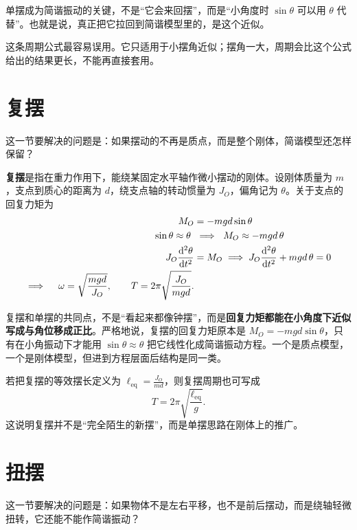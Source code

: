 \documentclass[lang=cn,11pt]{elegantbook}
\newcommand{\bridge}[1]{\begin{note}#1\end{note}}
\begin{document}
\bridge{单摆成为简谐振动的关键，不是“它会来回摆”，而是“小角度时 \(\sin\theta\) 可以用 \(\theta\) 代替”。也就是说，真正把它拉回到简谐模型里的，是这个近似。}

\begin{note}
这条周期公式最容易误用。它只适用于小摆角近似；摆角一大，周期会比这个公式给出的结果更长，不能再直接套用。
\end{note}

\section{复摆}

这一节要解决的问题是：如果摆动的不再是质点，而是整个刚体，简谐模型还怎样保留？

\textbf{复摆}是指在重力作用下，能绕某固定水平轴作微小摆动的刚体。设刚体质量为 \(m\)，支点到质心的距离为 \(d\)，绕支点轴的转动惯量为 \(J_O\)，偏角记为 \(\theta\)。关于支点的回复力矩为
\[
\begin{aligned}
M_O&=-mgd\sin\theta \\
\sin\theta\approx \theta\ &\implies\ M_O\approx -mgd\,\theta \\
J_O\dv[2]{\theta}{t}&=M_O
\implies J_O\dv[2]{\theta}{t}+mgd\,\theta=0 \\
\implies\quad
\omega=\sqrt{\frac{mgd}{J_O}},\qquad
T=2\pi\sqrt{\frac{J_O}{mgd}}.
\end{aligned}
\]

\begin{note}
复摆和单摆的共同点，不是“看起来都像钟摆”，而是\textbf{回复力矩都能在小角度下近似写成与角位移成正比}。严格地说，复摆的回复力矩原本是 \(M_O=-mgd\sin\theta\)，只有在小角振动下才能用 \(\sin\theta\approx\theta\) 把它线性化成简谐振动方程。一个是质点模型，一个是刚体模型，但进到方程层面后结构是同一类。
\end{note}

\begin{remark}
若把复摆的等效摆长定义为 \(\ell_{\text{eq}}=\frac{J_O}{md}\)，则复摆周期也可写成
\[
T=2\pi\sqrt{\frac{\ell_{\text{eq}}}{g}}.
\]
这说明复摆并不是“完全陌生的新摆”，而是单摆思路在刚体上的推广。
\end{remark}

\section{扭摆}

这一节要解决的问题是：如果物体不是左右平移，也不是前后摆动，而是绕轴轻微扭转，它还能不能作简谐振动？
\end{document}
